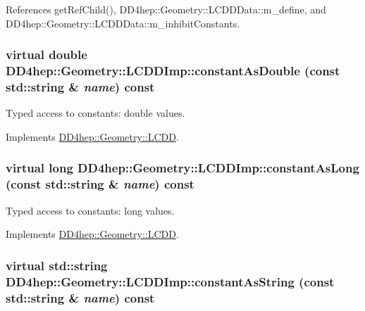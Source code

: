 References getRefChild(), DD4hep::Geometry::LCDDData::m\_\-define, and DD4hep::Geometry::LCDDData::m\_\-inhibitConstants.\hypertarget{class_d_d4hep_1_1_geometry_1_1_l_c_d_d_imp_a5d935f74487075d2297b2ae2884471b2}{
\subsubsection[{constantAsDouble}]{\setlength{\rightskip}{0pt plus 5cm}virtual double DD4hep::Geometry::LCDDImp::constantAsDouble (const std::string \& {\em name}) const}}
\label{class_d_d4hep_1_1_geometry_1_1_l_c_d_d_imp_a5d935f74487075d2297b2ae2884471b2}


Typed access to constants: double values. 

Implements \hyperlink{class_d_d4hep_1_1_geometry_1_1_l_c_d_d_a9696a0bb5af8abd3667460a617d4dc83}{DD4hep::Geometry::LCDD}.\hypertarget{class_d_d4hep_1_1_geometry_1_1_l_c_d_d_imp_a02ab7c49c65ba0c8c8df216b280ece39}{
\subsubsection[{constantAsLong}]{\setlength{\rightskip}{0pt plus 5cm}virtual long DD4hep::Geometry::LCDDImp::constantAsLong (const std::string \& {\em name}) const}}
\label{class_d_d4hep_1_1_geometry_1_1_l_c_d_d_imp_a02ab7c49c65ba0c8c8df216b280ece39}


Typed access to constants: long values. 

Implements \hyperlink{class_d_d4hep_1_1_geometry_1_1_l_c_d_d_a95370880f4063064af089b943b0e4ce2}{DD4hep::Geometry::LCDD}.\hypertarget{class_d_d4hep_1_1_geometry_1_1_l_c_d_d_imp_a4f7a333b0a12119a8a5d64591b38a298}{
\subsubsection[{constantAsString}]{\setlength{\rightskip}{0pt plus 5cm}virtual std::string DD4hep::Geometry::LCDDImp::constantAsString (const std::string \& {\em name}) const}}
\label{class_d_d4hep_1_1_geometry_1_1_l_c_d_d_imp_a4f7a333b0a12119a8a5d64591b38a298}



